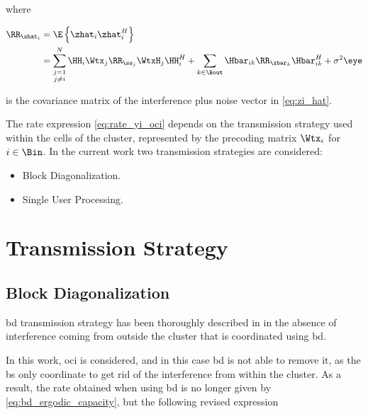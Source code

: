 \noindent
where

\begin{equation} \label{eq:zhat_cov}
\begin{aligned}
    \RR_{\zhat_i} &= \E\left\{\zhat_i\zhat_i^H\right\} \\
    &= \sum\limits_{\substack{j=1\\j\neq i}}^{N} \HH_i \Wtx_j \RR_{\ss_j}
    \WtxH_j \HH_i^H + \sum\limits_{k \in \Bout} \Hbar_{ik} \RR_{\xbar_k} 
    \Hbar_{ik}^H + \sigma^2\eye
\end{aligned}
\end{equation}

\noindent
is the covariance matrix of the interference plus noise vector in
\eqref{eq:zi_hat}.

The rate expression \eqref{eq:rate_yi_oci} depends on the transmission strategy
used within the cells of the cluster, represented by the precoding matrix
$\Wtx_i$ for $i \in \Bin$. In the current work two transmission strategies are
considered:

\begin{itemize}
    \item Block Diagonalization.
    \item Single User Processing.
\end{itemize}

\section{Transmission Strategy} \label{ssec:sched_strategy}

\subsection{Block Diagonalization} \label{ssec:sched_bd}

\gls{bd} transmission strategy has been thoroughly described in  in
the absence of interference coming from outside the cluster that is coordinated
using \gls{bd}.

In this work, \gls{oci} is considered, and in this case \gls{bd}
is not able to remove it, as the \gls{bs} only coordinate to get rid of the
interference from within the cluster. As a result, the rate obtained when using
\gls{bd} is no longer given by \eqref{eq:bd_ergodic_capacity}, but the following
revised expression

